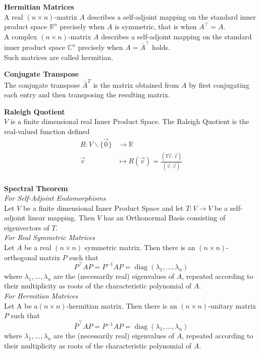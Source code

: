 \documentclass[a4paper, 10pt]{article}
\begin{document}
\begin{multicols*}{3}
\textbf{Hermitian Matrices}\\
A real $(n \times n)$-matrix $A$ describes a self-adjoint mapping on the standard inner product space $\mathbb{R}^n$ precisely when $A$ is symmetric, that is when $A^{\top}=A$. \\
A complex $(n \times n)$-matrix $A$ describes a self-adjoint mapping on the standard inner product space $\mathbb{C}^n$ precisely when $A=\bar{A}^{\top}$ holds. \\
Such matrices are called hermitian.

\textbf{Conjugate Transpose}\\
The conjugate transpose $\bar{A}^T$ is the matrix obtained from $A$ by first conjugating each entry and then transposing the resulting matrix. 

\textbf{Raleigh Quotient}\\
$V$ is a finite dimensional real Inner Product Space. 
The Raleigh Quotient is the real-valued function defined 
\begin{align}
R: V \backslash\{\overrightarrow{0}\} &\rightarrow \mathbb{R}\\
\vec{v} &\mapsto R(\vec{v})=\frac{(T \vec{v}, \vec{v})}{(\vec{v}, \vec{v})}\\
\end{align}

\textbf{Spectral Theorem}\\
\textit{For Self-Adjoint Endomorphisms}\\
Let $V$ be a finite dimensional Inner Product Space and let $T: V \rightarrow V$ be a self-adjoint linear mapping. 
Then $V$ has an Orthonormal Basis consisting of eigenvectors of $T$.\\
\textit{For Real Symmetric Matrices}\\
Let $A$ be a real $(n \times n)$ symmetric matrix. Then there is an $(n \times n)$-orthogonal matrix $P$ such that
$$
P^{\top} A P=P^{-1} A P=\operatorname{diag}\left(\lambda_1, \ldots, \lambda_n\right)
$$
where $\lambda_1, \ldots, \lambda_n$ are the (necessarily real) eigenvalues of $A$, repeated according to their multiplicity as roots of the characteristic polynomial of $A$.\\
\textit{For Hermitian Matrices}\\
Let A be $a(n \times n)$-hermitian matrix. Then there is an $(n \times n)$-unitary matrix $P$ such that
$$
\bar{P}^{\top} A P=P^{-1} A P=\operatorname{diag}\left(\lambda_1, \ldots, \lambda_n\right)
$$
where $\lambda_1, \ldots, \lambda_n$ are the (necessarily real) eigenvalues of $A$, repeated according to their multiplicity as roots of the characteristic polynomial of $A$.


\end{multicols*}
\end{document}
